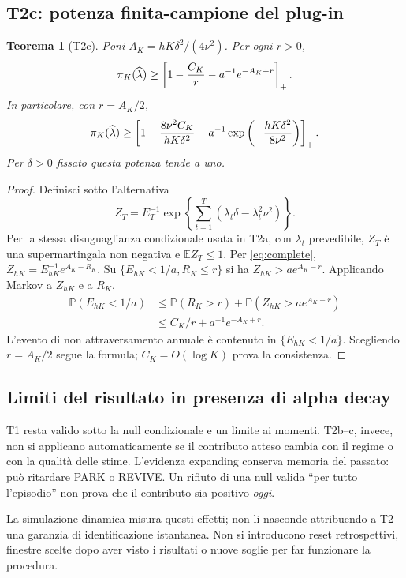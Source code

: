 \documentclass[11pt,a4paper]{article}
\newtheorem{theorem}{Teorema}[section]
\theoremstyle{definition}\newtheorem{definition}[theorem]{Definizione}
\theoremstyle{remark}\newtheorem{remark}[theorem]{Osservazione}
\newcommand{\E}{\mathbb E}\newcommand{\PP}{\mathbb P}\newcommand{\R}{\mathbb R}
\begin{document}
\subsection{T2c: potenza finita-campione del plug-in}
\begin{theorem}[T2c]
Poni $A_K=hK\delta^2/(4\nu^2)$. Per ogni $r>0$,
\begin{equation}
 \pi_K(\widehat\lambda)\ge\left[1-\frac{C_K}{r}-a^{-1}e^{-A_K+r}\right]_+.\label{eq:poweradaptive}
\end{equation}
In particolare, con $r=A_K/2$,
\begin{equation}
 \pi_K(\widehat\lambda)\ge
 \left[1-\frac{8\nu^2 C_K}{hK\delta^2}
       -a^{-1}\exp\left(-\frac{hK\delta^2}{8\nu^2}\right)\right]_+.
\end{equation}
Per $\delta>0$ fissato questa potenza tende a uno.
\end{theorem}
\begin{proof}
Definisci sotto l'alternativa
\begin{equation}
 Z_T=E_T^{-1}\exp\left\{\sum_{t=1}^T(\lambda_t\delta-\lambda_t^2\nu^2)\right\}.
\end{equation}
Per la stessa disuguaglianza condizionale usata in T2a, con $\lambda_t$ prevedibile, $Z_T$ è una supermartingala non negativa e $\E Z_T\le1$. Per \eqref{eq:complete}, $Z_{hK}=E_{hK}^{-1}e^{A_K-R_K}$. Su $\{E_{hK}<1/a,R_K\le r\}$ si ha $Z_{hK}>ae^{A_K-r}$. Applicando Markov a $Z_{hK}$ e a $R_K$,
\begin{align*}
 \PP(E_{hK}<1/a)&\le\PP(R_K>r)+\PP(Z_{hK}>ae^{A_K-r})\\
 &\le C_K/r+a^{-1}e^{-A_K+r}.
\end{align*}
L'evento di non attraversamento annuale è contenuto in $\{E_{hK}<1/a\}$. Scegliendo $r=A_K/2$ segue la formula; $C_K=O(\log K)$ prova la consistenza.
\end{proof}

\subsection{Limiti del risultato in presenza di alpha decay}
T1 resta valido sotto la null condizionale e un limite ai momenti. T2b--c, invece, non si applicano automaticamente se il contributo atteso cambia con il regime o con la qualità delle stime. L'evidenza expanding conserva memoria del passato: può ritardare PARK o REVIVE. Un rifiuto di una null valida ``per tutto l'episodio'' non prova che il contributo sia positivo \emph{oggi}.

La simulazione dinamica misura questi effetti; non li nasconde attribuendo a T2 una garanzia di identificazione istantanea. Non si introducono reset retrospettivi, finestre scelte dopo aver visto i risultati o nuove soglie per far funzionare la procedura.
\end{document}
